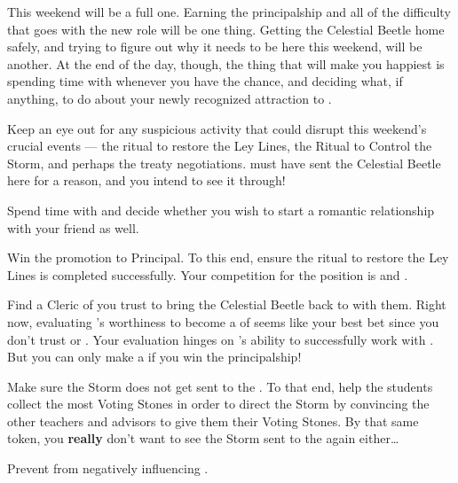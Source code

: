\documentclass[char]{GL2020}
\begin{document}
This weekend will be a full one. Earning the principalship and all of the difficulty that goes with the new role will be one thing. Getting the Celestial Beetle home safely, and trying to figure out why it needs to be here this weekend, will be another. At the end of the day, though, the thing that will make you happiest is spending time with \cJuniorStatesman{} whenever you have the chance, and deciding what, if anything, to do about your newly recognized attraction to \cEthics{}.

\begin{itemz}
    \item Keep an eye out for any suspicious activity that could disrupt this weekend’s crucial events — the ritual to restore the Ley Lines, the Ritual to Control the Storm, and perhaps the treaty negotiations. \cTechGod{} must have sent the Celestial Beetle here for a reason, and you intend to see it through! 
    \item Spend time with \cJuniorStatesman{} and decide whether you wish to start a romantic relationship with your friend \cEthics{} as well.
    \item Win the promotion to Principal. To this end, ensure the ritual to restore the Ley Lines is completed successfully. Your competition for the position is \cMusic{} and \cChupSecond{}.
    \item Find a Cleric of \cTechGod{} you trust to bring the Celestial Beetle back to \pTech{} with them. Right now, evaluating \cHeadScientist{}'s worthiness to become a \cHeadScientist{\cleric} of \cTechGod{} seems like your best bet since you don’t trust \cAntiChup{} or \cScholarship{}. Your evaluation hinges on \cHeadScientist{}’s ability to successfully work with \cEbbPriest{}. But you can only make \cHeadScientist{} a \cHeadScientist{\cleric} if you win the principalship!
\end{itemz}

\begin{itemz}
    \item Make sure the Storm does not get sent to the \pTech{}. To that end, help the \pFPF{} students collect the most Voting Stones in order to direct the Storm by convincing the other teachers and advisors to give them their Voting Stones. By that same token, you \textbf{really} don’t want to see the Storm sent to the \pShip{} again either\ldots 
    \item Prevent \cAmbition{} from negatively influencing \cHeir{}.
\end{itemz}
\end{document}

